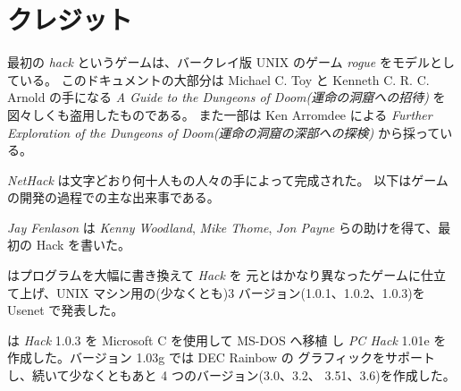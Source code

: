 \section{クレジット}
最初の {\it hack\/} というゲームは、バークレイ版
UNIX のゲーム {\it rogue\/} をモデルとしている。
このドキュメントの大部分は Michael C. Toy と Kenneth C. R. C. Arnold の手になる
{\it A Guide to the Dungeons of Doom(運命の洞窟への招待)} を図々しくも盗用したものである。
また一部は Ken Arromdee による 
{\it Further Exploration of the Dungeons of Doom(運命の洞窟の深部への探検)}
から採っている。

{\it NetHack\/} は文字どおり何十人もの人々の手によって完成された。
以下はゲームの開発の過程での主な出来事である。

\bigskip
{\it Jay Fenlason} は {\it Kenny Woodland}, {\it Mike Thome}, {\it Jon Payne}
らの助けを得て、最初の Hack を書いた。

\medskip
 はプログラムを大幅に書き換えて {\it Hack\/} を
元とはかなり異なったゲームに仕立て上げ、UNIX
マシン用の(少なくとも)3 バージョン(1.0.1、1.0.2、1.0.3)を Usenet で発表した。

\medskip
 は {\it Hack\/} 1.0.3 を Microsoft C を使用して MS-DOS へ移植
し {\it PC Hack\/} 1.01e を作成した。バージョン 1.03g では DEC Rainbow の
グラフィックをサポートし、続いて少なくともあと 4 つのバージョン(3.0、3.2、
3.51、3.6)を作成した。


